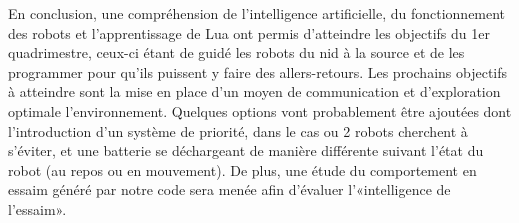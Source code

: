 En conclusion, une compréhension de l'intelligence artificielle, du fonctionnement des robots et l'apprentissage de Lua ont permis d'atteindre les objectifs du 1er quadrimestre, ceux-ci étant de guidé les robots du nid à la source et de les programmer pour qu'ils puissent y faire des allers-retours. 
Les prochains objectifs à atteindre sont la mise en place d'un moyen de communication et d'exploration optimale l'environnement. Quelques options vont probablement être ajoutées dont l'introduction d'un système de priorité, dans le cas ou 2 robots cherchent à s'éviter, et une batterie se déchargeant de manière différente suivant l'état du robot (au repos ou en mouvement). De plus, une étude du comportement en essaim généré par notre code sera menée afin d'évaluer l'«intelligence de l'essaim».